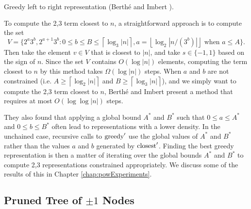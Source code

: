 \documentclass{ucalgthes1}
\theoremstyle{definition}
\newcommand{\algnewline}{\par\noindent\hskip\algorithmicindent}
\newcommand{\ZZ}{\mathbb{Z}}
\newcommand{\ZZgez}{\mathbb{Z}_{\ge 0}}
\newcommand{\floor}[1]{\left\lfloor #1 \right\rfloor}
\newcommand{\ceil}[1]{\left\lceil #1 \right\rceil}
\begin{document}
\begin{algorithm}[htb]
\caption{Greedy left to right representation (Berth{\'e} and Imbert \cite{Berthe2009}).}
\label{alg:greedyltor}
\end{algorithm}

To compute the 2,3 term closest to $n$, a straightforward approach is to compute the set 
\[
V = \{2^a3^b, 2^{a+1}3^b : 0 \le b \le B \le \ceil{\log_3|n|}, a=\floor{\log_2|n/(3^b)|} \textrm{ when } a \le A\}.
\]
Then take the element $v \in V$ that is closest to $|n|$, and take $s \in \{-1, 1\}$ based on the sign of $n$. Since the set $V$ contains $O(\log |n|)$ elements, computing the term closest to $n$ by this method takes $\Omega(\log |n|)$ steps.  When $a$ and $b$ are not constrained (i.e. $A \ge \ceil{\log_2|n|}$ and $B \ge \ceil{\log_3|n|}$), and we simply want to compute the 2,3 term closest to $n$, Berth\'{e} and Imbert \cite{Berthe2009} present a method that requires at most $O(\log \log |n|)$ steps. 

They also found that applying a global bound $A^*$ and $B^*$ such that $0 \le a \le A^*$ and $0 \le b \le B^*$ often lead to representations with a lower density.  In the unchained case, recursive calls to $\textrm{greedy}'$ use the global values of $A^*$ and $B^*$ rather than the values $a$ and $b$ generated by $\textrm{closest}'$.  Finding the best greedy representation is then a matter of iterating over the global bounds $A^*$ and $B^*$ to compute 2,3 representations constrained appropriately.  We discuss some of the results of this in Chapter \ref{chap:powExperiments}.


\subsection{Pruned Tree of $\pm1$ Nodes}
\label{subsec:pm1Tree}
\end{document}
